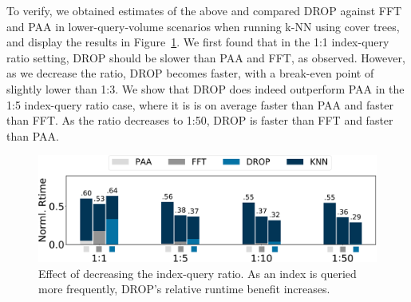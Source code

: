 To verify, we obtained estimates of the above and compared DROP against FFT and PAA in lower-query-volume scenarios when running k-NN using cover trees, and display the results in Figure~\ref{fig:query}.
We first found that in the 1:1 index-query ratio setting, DROP should be slower than PAA and FFT, as observed. 
However, as we decrease the ratio, DROP becomes faster, with a break-even point of slightly lower than 1:3. 
We show that DROP does indeed outperform PAA  in the 1:5 index-query ratio case, where it is is on average \red{$1.51\times$} faster than PAA and \red{$1.03\times$} faster than FFT. 
As the ratio decreases to 1:50, DROP is \red{$1.24\times$} faster than FFT and \red{$1.9\times$} faster than PAA.  


\begin{figure}
\includegraphics[width=\linewidth]{figs/query-rev.pdf}
\caption[]{Effect of decreasing the index-query ratio. As an index is queried more frequently, DROP's relative runtime benefit  increases.}
\label{fig:query}
\end{figure}

